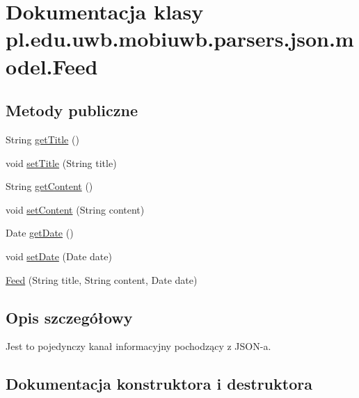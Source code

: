\hypertarget{classpl_1_1edu_1_1uwb_1_1mobiuwb_1_1parsers_1_1json_1_1model_1_1_feed}{}\section{Dokumentacja klasy pl.\+edu.\+uwb.\+mobiuwb.\+parsers.\+json.\+model.\+Feed}
\label{classpl_1_1edu_1_1uwb_1_1mobiuwb_1_1parsers_1_1json_1_1model_1_1_feed}
\subsection*{Metody publiczne}
\begin{DoxyCompactItemize}
\item 
String \hyperlink{classpl_1_1edu_1_1uwb_1_1mobiuwb_1_1parsers_1_1json_1_1model_1_1_feed_a15f20b2f2d8844008864114dcb3daefb}{get\+Title} ()
\item 
void \hyperlink{classpl_1_1edu_1_1uwb_1_1mobiuwb_1_1parsers_1_1json_1_1model_1_1_feed_a23cec9ca2cc65ff347ce6d4107bcd244}{set\+Title} (String title)
\item 
String \hyperlink{classpl_1_1edu_1_1uwb_1_1mobiuwb_1_1parsers_1_1json_1_1model_1_1_feed_ad6d00db9788e881eb1e5470d87f70125}{get\+Content} ()
\item 
void \hyperlink{classpl_1_1edu_1_1uwb_1_1mobiuwb_1_1parsers_1_1json_1_1model_1_1_feed_ab0987e770e6e2a7b2663df5e280ae4dd}{set\+Content} (String content)
\item 
Date \hyperlink{classpl_1_1edu_1_1uwb_1_1mobiuwb_1_1parsers_1_1json_1_1model_1_1_feed_a54126b3bdf6f5c7ac0e42b45282cb6a1}{get\+Date} ()
\item 
void \hyperlink{classpl_1_1edu_1_1uwb_1_1mobiuwb_1_1parsers_1_1json_1_1model_1_1_feed_ac3a70c9301b1c0276d00799a0436ed09}{set\+Date} (Date date)
\item 
\hyperlink{classpl_1_1edu_1_1uwb_1_1mobiuwb_1_1parsers_1_1json_1_1model_1_1_feed_a82d20c1d35a8d25c6fa13f9bbf4050d4}{Feed} (String title, String content, Date date)
\end{DoxyCompactItemize}


\subsection{Opis szczegółowy}
Jest to pojedynczy kanał informacyjny pochodzący z J\+S\+O\+N-\/a. 

\subsection{Dokumentacja konstruktora i destruktora}
\hypertarget{classpl_1_1edu_1_1uwb_1_1mobiuwb_1_1parsers_1_1json_1_1model_1_1_feed_a82d20c1d35a8d25c6fa13f9bbf4050d4}{}
